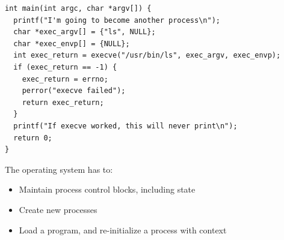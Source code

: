   \begin{slide}


    \begin{verbatim}
int main(int argc, char *argv[]) {
  printf("I'm going to become another process\n");
  char *exec_argv[] = {"ls", NULL};
  char *exec_envp[] = {NULL};
  int exec_return = execve("/usr/bin/ls", exec_argv, exec_envp);
  if (exec_return == -1) {
    exec_return = errno;
    perror("execve failed");
    return exec_return;
  }
  printf("If execve worked, this will never print\n");
  return 0;
}
    \end{verbatim}
  \end{slide}

  \begin{slide}

    The operating system has to:
    \begin{itemize}
      \item Maintain process control blocks, including state
      \item Create new processes
      \item Load a program, and re-initialize a process with context
    \end{itemize}

  \end{slide}


